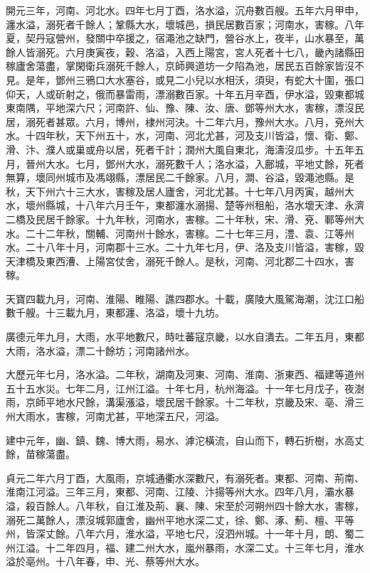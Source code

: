 \begin{pinyinscope}
 開元三年，河南、河北水。四年七月丁酉，洛水溢，沉舟數百艘。五年六月甲申，瀍水溢，溺死者千餘人；鞏縣大水，壞城邑，損民居數百家；河南水，害稼。八年夏，契丹寇營州，發關中卒援之，宿澠池之缺門，營谷水上，夜半，山水暴至，萬餘人皆溺死。六月庚寅夜，穀、洛溢，入西上陽宮，宮人死者十七八，畿內諸縣田稼廬舍蕩盡，掌閑衛兵溺死千餘人，京師興道坊一夕陷為池，居民五百餘家皆沒不見。是年，鄧州三鴉口大水塞谷，或見二小兒以水相沃，須臾，有蛇大十圍，張口仰天，人或斫射之，俄而暴雷雨，漂溺數百家。十年五月辛酉，伊水溢，毀東都城東南隅，平地深六尺；河南許、仙、豫、陳、汝、唐、鄧等州大水，害稼，漂沒民居，溺死者甚眾。六月，博州，棣州河決。十二年六月，豫州大水。八月，兗州大水。十四年秋，天下州五十，水，河南、河北尤甚，河及支川皆溢，懷、衛、鄭、滑、汴、濮人或巢或舟以居，死者千計；潤州大風自東北，海濤沒瓜步。十五年五月，晉州大水。七月，鄧州大水，溺死數千人；洛水溢，入鄜城，平地丈餘，死者無算，壞同州城市及馮翊縣，漂居民二千餘家。八月，澗、谷溢，毀澠池縣。是秋，天下州六十三大水，害稼及居人廬舍，河北尤甚。十七年八月丙寅，越州大水，壞州縣城，十八年六月壬午，東都瀍水溺揚、楚等州租船，洛水壞天津、永濟二橋及民居千餘家。十九年秋，河南水，害稼。二十年秋，宋、滑、兗、鄆等州大水。二十二年秋，關輔、河南州十餘水，害稼。二十七年三月，澧、袁、江等州水。二十八年十月，河南郡十三水。二十九年七月，伊、洛及支川皆溢，害稼，毀天津橋及東西漕、上陽宮仗舍，溺死千餘人。是秋，河南、河北郡二十四水，害稼。



 天寶四載九月，河南、淮陽、睢陽、譙四郡水。十載，廣陵大風駕海潮，沈江口船數千艘。十三載九月，東都瀍、洛溢，壞十九坊。



 廣德元年九月，大雨，水平地數尺，時吐蕃寇京畿，以水自潰去。二年五月，東都大雨，洛水溢，漂二十餘坊；河南諸州水。



 大歷元年七月，洛水溢。二年秋，湖南及河東、河南、淮南、浙東西、福建等道州五十五水災。七年二月，江州江溢。十年七月，杭州海溢。十一年七月戊子，夜澍雨，京師平地水尺餘，溝渠漲溢，壞民居千餘家。十二年秋，京畿及宋、亳、滑三州大雨水，害稼，河南尤甚，平地深五尺，河溢。



 建中元年，幽、鎮、魏、博大雨，易水、滹沱橫流，自山而下，轉石折樹，水高丈餘，苗稼蕩盡。



 貞元二年六月丁酉，大風雨，京城通衢水深數尺，有溺死者。東都、河南、荊南、淮南江河溢。三年三月，東都、河南、江陵、汴揚等州大水。四年八月，灞水暴溢，殺百餘人。八年秋，自江淮及荊、襄、陳、宋至於河朔州四十餘大水，害稼，溺死二萬餘人，漂沒城郭廬舍，幽州平地水深二丈，徐、鄭、涿、薊、檀、平等州，皆深丈餘。八年六月，淮水溢，平地七尺，沒泗州城。十一年十月，朗、蜀二州江溢。十二年四月，福、建二州大水，嵐州暴雨，水深二丈。十三年七月，淮水溢於亳州。十八年春，申、光、蔡等州大水。




\end{pinyinscope}

